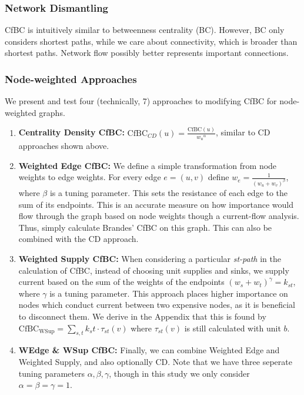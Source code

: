\documentclass{article}
\begin{document}
\subsubsection{Network Dismantling}
CfBC is intuitively similar to betweenness centrality (BC). However, BC only considers shortest paths, while we care about connectivity, which is broader than shortest paths. Network flow possibly better represents important connections.

\subsubsection{Node-weighted Approaches}
We present and test four (technically, 7) approaches to modifying CfBC for node-weighted graphs.
\begin{enumerate}[label=\textbf{\Alph*}.]
\item \textbf{Centrality Density CfBC:} $\text{CfBC}_{CD}(u) = \frac{\text{CfBC}(u)}{{w_u}^\alpha}$, similar to CD approaches shown above.
\item \textbf{Weighted Edge  CfBC:} We define a simple transformation from node weights to edge weights. For every edge $e = (u, v)$ define $w_e = \frac{1}{(w_u + w_v)^\beta}$, where $\beta$ is a tuning parameter. This sets the resistance of each edge to the sum of its endpoints. This is an accurate measure on how importance would flow through the graph based on node weights though a current-flow analysis. Thus, simply calculate Brandes' CfBC on this graph. This can also be combined with the CD approach.
\item \textbf{Weighted Supply CfBC:} When considering a particular \textit{st-path} in the calculation of CfBC, instead of choosing unit supplies and sinks, we supply current based on the sum of the weights of the endpoints $(w_s + w_t)^\gamma = k_{st}$, where $\gamma$ is a tuning parameter. This approach places higher importance on nodes which conduct current between two expensive nodes, as it is beneficial to disconnect them. We derive in the Appendix that this is found by
$ 
\text{CfBC}_{\text{WSup}} = \sum_{s,t} k_st \cdot \tau_{st}(v)
$
where $\tau_{st}(v)$ is still calculated with unit $b$.
\item \textbf{WEdge \& WSup CfBC:} Finally, we can combine Weighted Edge and Weighted Supply, and also optionally CD. Note that we have three seperate tuning parameters $\alpha, \beta, \gamma$, though in this study we only consider $\alpha = \beta = \gamma = 1$.
\end{enumerate}
\end{document}
